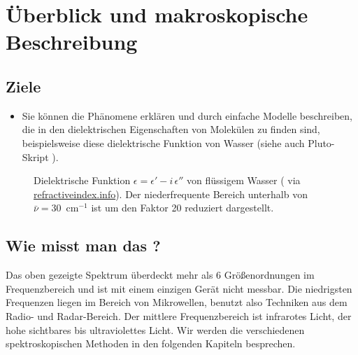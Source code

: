 \renewcommand{\chapterauthors}{Markus Lippitz}
\renewcommand{\lastmod}{7. November 2021}

\chapter{Überblick und makroskopische Beschreibung}

\label{chap:4_diel}


\section{Ziele}

\begin{itemize}
\item Sie können die Phänomene erklären und durch einfache Modelle beschreiben, die in den  dielektrischen Eigenschaften von Molekülen zu finden sind, beispielsweise diese dielektrische Funktion von Wasser (siehe auch Pluto-Skript ).


\end{itemize}

\begin{figure}
\caption{Dielektrische Funktion $\epsilon = \epsilon' - i \, \epsilon''$ von flüssigem Wasser (\cite{Segelstein_water} via 
\href{https://refractiveindex.info/?shelf=main&book=H2O&page=Segelstein}{refractiveindex.info}). Der niederfrequente Bereich unterhalb von $\bar{\nu} = 30$~cm$^{-1}$ ist um den Faktor 20 reduziert dargestellt.
\label{fig:diel_water}}

\end{figure}

\section{Wie misst man das ?}

Das oben gezeigte Spektrum überdeckt mehr als 6 Größenordnungen im Frequenzbereich und ist mit einem einzigen Gerät nicht  messbar. Die niedrigsten Frequenzen liegen im Bereich von Mikrowellen, benutzt also Techniken aus dem Radio- und Radar-Bereich. Der mittlere Frequenzbereich ist infrarotes Licht, der hohe sichtbares bis ultraviolettes Licht. Wir werden die verschiedenen spektroskopischen Methoden in den folgenden Kapiteln besprechen.


